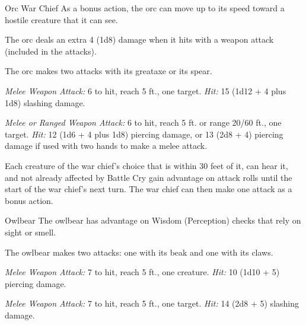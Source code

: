 \documentclass[10pt,a4paper,twoside,bg=print,twocolumn,openany,nodeprecatedcode]{dndbook}
\begin{document}
\begin{DndMonster}[float=t]{Orc War Chief}
\DndMonsterBasics[
armor-class = {16 (\textit{chain mail})},
hit-points = {\DndDice{11d8 + 44}},
speed = {30 ft.}
]
\DndMonsterAbilityScores[
 str = 18,
 dex = 12,
 con = 18,
 int = 11,
 wis = 11,
 cha = 16
]
\DndMonsterDetails[
saving-throws = {Str +6, Con +6, Wis +2},
skills = {Intimidation +5},
senses = {darkvision 60 ft., passive perception 10},
languages = {Common, Orc},
challenge = 4,
]
As a bonus action, the orc can move up to its speed toward a hostile creature that it can see.

The orc deals an extra 4 (1d8) damage when it hits with a weapon attack (included in the attacks).

The orc makes two attacks with its greataxe or its spear.

\textsl{Melee Weapon Attack:} 6 to hit, reach 5 ft., one target. \textsl{Hit:} 15 (1d12 + 4 plus 1d8) slashing damage.

\textsl{Melee or Ranged Weapon Attack:} 6 to hit, reach 5 ft. or range 20/60 ft., one target. \textsl{Hit:} 12 (1d6 + 4 plus 1d8) piercing damage, or 13 (2d8 + 4) piercing damage if used with two hands to make a melee attack.

Each creature of the war chief's choice that is within 30 feet of it, can hear it, and not already affected by Battle Cry gain advantage on attack rolls until the start of the war chief's next turn. The war chief can then make one attack as a bonus action.

\end{DndMonster}



\begin{DndMonster}[float=t]{Owlbear}
\DndMonsterBasics[
armor-class = {13 (natural armor)},
hit-points = {\DndDice{7d10 + 21}},
speed = {40 ft.}
]
\DndMonsterAbilityScores[
 str = 20,
 dex = 12,
 con = 17,
 int = 3,
 wis = 12,
 cha = 7
]
\DndMonsterDetails[
skills = {Perception +3},
senses = {darkvision 60 ft., passive perception 13},
challenge = 3,
]
The owlbear has advantage on Wisdom (Perception) checks that rely on sight or smell.

The owlbear makes two attacks: one with its beak and one with its claws.

\textsl{Melee Weapon Attack:} 7 to hit, reach 5 ft., one creature. \textsl{Hit:} 10 (1d10 + 5) piercing damage.

\textsl{Melee Weapon Attack:} 7 to hit, reach 5 ft., one target. \textsl{Hit:} 14 (2d8 + 5) slashing damage.

\end{DndMonster}
\end{document}
